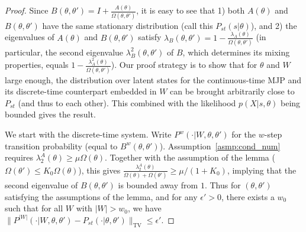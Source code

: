 \begin{proof}
Since $B(\theta, \theta') = I+\frac{A(\theta)}{\Omega(\theta, \theta')}$, 
it is easy to see that 1) both $A(\theta)$ and $B(\theta,\theta')$ have 
the same stationary distribution (call this $P_{st}(s|\theta)$), and 2) the 
eigenvalues of $A(\theta)$ and $B(\theta,\theta')$ satisfy $\lambda_B(\theta, \theta') = 
1 - \frac{\lambda_A(\theta)}{\Omega(\theta, \theta')}$ (in particular,
the second eigenvalue $\lambda^2_B(\theta,\theta')$ of $B$, which 
determines its mixing properties, equals 
$1 - \frac{\lambda^2_A(\theta)}{\Omega(\theta, \theta')}$). Our proof 
strategy is to show that for $\theta$ and $W$ large enough, the 
distribution over latent states for the continuous-time MJP and 
its discrete-time counterpart embedded in $W$ can be brought arbitrarily 
close to $P_{st}$ (and thus to each other). This combined with the 
likelihood $p(X|s, \theta)$ being bounded  gives the result.

We start with the discrete-time system. Write 
$P^{w}(\cdot | W, \theta, \theta' )$ for the $w$-step transition 
probability (equal to $B^w(\theta, \theta')$).
Assumption~\ref{asmp:cond_num} requires 
$\lambda^A_2(\theta) \geq \mu \Omega(\theta)$. 
Together with the assumption of the lemma ($\Omega(\theta') 
\leq K_0 \Omega(\theta)$), this gives 
$\frac{\lambda^A_2(\theta)}{\Omega(\theta) + \Omega(\theta')} \geq 
\mu / (1 + K_0) $, implying that the second eigenvalue of 
$B(\theta, \theta')$ is bounded away from $1$.
Thus for $(\theta,\theta')$ satisfying the assumptions of the lemma, 
and for any $\epsilon' > 0$, there exists a $w_0$ such that for all $W$ 
with $|W| > w_0$, we have $\parallel P^{|W|}(\cdot | W, \theta, \theta')
- P_{st}(\cdot | \theta, \theta')\parallel_{\text{TV}} \leq 
{\epsilon'}$. 



\end{proof}
